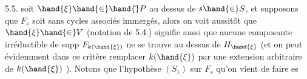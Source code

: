 5.5.  soit $\hand{\xi}\hand{\in}\hand{\check{}}P$ au dessus de $s\hand{\in} S$, et supposons
que $F_s$ soit sans cycles associés immergés, alors on voit aussitôt que
$\hand{\xi}\hand{\in} V$ (notation de 5.4.) signifie aussi que aucune composante
irréductible de supp $F_{k(\hand{\xi})}$ ne se trouve au dessus de $H_{\hand{\xi}}$ (et on peut
évidemment dans ce critère remplacer $k(\hand{\xi})$ par une extension arbitraire
de $k(\hand{\xi})$ ). Notons que l'hypothèse $(S_1)$ sur $F_s$ qu'on vient de faire es

